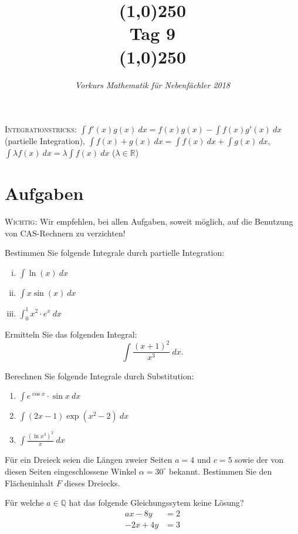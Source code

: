\documentclass[11pt]{article}
\begin{document}
\title{\line(1,0){250}\\Tag 9\\\line(1,0){250}}
\date{}
\author{\itshape Vorkurs Mathematik für Nebenfächler 2018}
\maketitle
\begin{framed}
	\noindent \scriptsize
	\textsc{Integrationstricks:} $\int f'(x)g(x)~dx =f(x)g(x)-\int f(x)g'(x)~dx$ (partielle Integration), $\int f(x)+g(x)~dx = \int f(x)~dx + \int g(x)~dx$, $\int \lambda f(x)~dx = \lambda \int f(x)~dx$ ($\lambda \in \mathbb{R}$)
\end{framed}
\section*{Aufgaben}
\textsc{Wichtig:} Wir empfehlen, bei allen Aufgaben, soweit möglich, auf die Benutzung von CAS-Rechnern zu verzichten!
\begin{task}
	Bestimmen Sie folgende Integrale durch partielle Integration:
	\begin{enumerate}[i)]
		\item $\int \ln(x)~dx$
		\item $\int x\sin(x)~dx$
		\item $\int_0^1 x^2\cdot e^{x}~dx$
	\end{enumerate}
\end{task}
\begin{task}
	Ermitteln Sie das folgenden Integral:
	\[
	\int \frac{(x+1)^2}{x^3}~dx.
	\]
\end{task}
\begin{task}
	Berechnen Sie folgende Integrale durch Substitution:
\begin{enumerate}
	\item $\int e^{\cos x}\cdot \sin x~dx$
	\item $\int (2x-1)\exp(x^2-2)~dx$
	\item $\int \frac{(\ln x^3)^2}{x}~dx$
\end{enumerate}
\end{task}
\dotfill
\begin{task}
	F\"ur ein Dreieck seien die L\"angen zweier Seiten $a=4$ und $c=5$ sowie
	der von diesen Seiten eingeschlossene Winkel $\alpha=30^\circ$ bekannt.
	Bestimmen Sie den Fl\"acheninhalt $F$ dieses Dreiecks.
\end{task}
\begin{task}
	Für welche $a\in \mathbb{Q}$ hat das folgende Gleichungssytem keine Lösung?
	\begin{align*}
		ax-8y&= 2\\
		-2x+4y&=3
	\end{align*}
\end{task}
\end{document}
